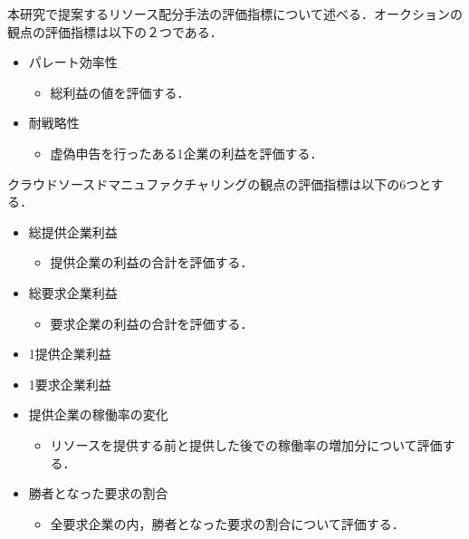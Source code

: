 本研究で提案するリソース配分手法の評価指標について述べる．オークションの観点の評価指標は以下の２つである．

\begin{itemize}
\tightlist
\item
  パレート効率性

  \begin{itemize}
  \tightlist
  \item
    総利益の値を評価する．
  \end{itemize}
\item
  耐戦略性

  \begin{itemize}
  \tightlist
  \item
    虚偽申告を行ったある1企業の利益を評価する．
  \end{itemize}
\end{itemize}

クラウドソースドマニュファクチャリングの観点の評価指標は以下の6つとする．

\begin{itemize}
\tightlist
\item
  総提供企業利益

  \begin{itemize}
  \tightlist
  \item
    提供企業の利益の合計を評価する．
  \end{itemize}
\item
  総要求企業利益

  \begin{itemize}
  \tightlist
  \item
    要求企業の利益の合計を評価する．
  \end{itemize}
\item
  1提供企業利益
\item
  1要求企業利益
\item
  提供企業の稼働率の変化

  \begin{itemize}
  \tightlist
  \item
    リソースを提供する前と提供した後での稼働率の増加分について評価する．
  \end{itemize}
\item
  勝者となった要求の割合

  \begin{itemize}
  \tightlist
  \item
    全要求企業の内，勝者となった要求の割合について評価する．
  \end{itemize}
\end{itemize}

